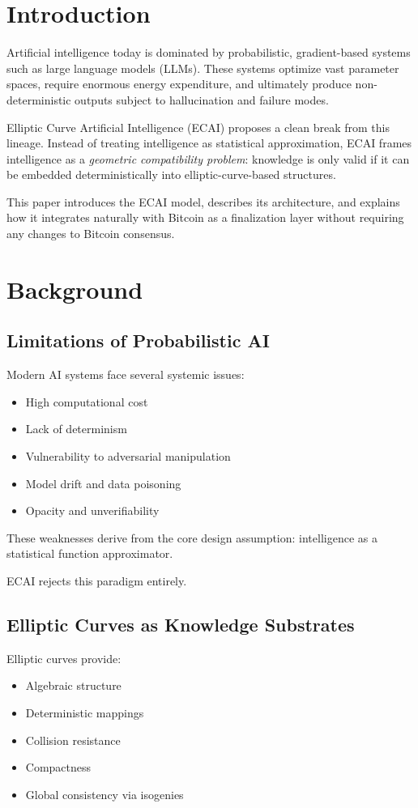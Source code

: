 \documentclass[11pt]{article}
\begin{document}
\section{Introduction}

Artificial intelligence today is dominated by probabilistic, gradient-based systems such as large language models (LLMs). These systems optimize vast parameter spaces, require enormous energy expenditure, and ultimately produce non-deterministic outputs subject to hallucination and failure modes.

Elliptic Curve Artificial Intelligence (ECAI) proposes a clean break from this lineage. Instead of treating intelligence as statistical approximation, ECAI frames intelligence as a \emph{geometric compatibility problem}: knowledge is only valid if it can be embedded deterministically into elliptic-curve-based structures.

This paper introduces the ECAI model, describes its architecture, and explains how it integrates naturally with Bitcoin as a finalization layer without requiring any changes to Bitcoin consensus.

\section{Background}

\subsection{Limitations of Probabilistic AI}
Modern AI systems face several systemic issues:
\begin{itemize}[noitemsep]
    \item High computational cost
    \item Lack of determinism
    \item Vulnerability to adversarial manipulation
    \item Model drift and data poisoning
    \item Opacity and unverifiability
\end{itemize}

These weaknesses derive from the core design assumption: intelligence as a statistical function approximator.

ECAI rejects this paradigm entirely.

\subsection{Elliptic Curves as Knowledge Substrates}
Elliptic curves provide:
\begin{itemize}[noitemsep]
    \item Algebraic structure
    \item Deterministic mappings
    \item Collision resistance
    \item Compactness
    \item Global consistency via isogenies
\end{itemize}
\end{document}
